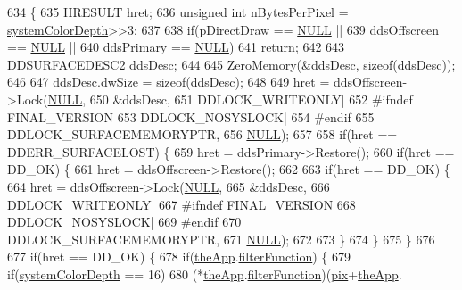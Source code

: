 \begin{DoxyCode}
634 \{
635   HRESULT hret;
636   \textcolor{keywordtype}{unsigned} \textcolor{keywordtype}{int} nBytesPerPixel = \mbox{\hyperlink{system_8cpp_adaf454a4617a00b5cfed14c203ab6efa}{systemColorDepth}}>>3;
637 
638   \textcolor{keywordflow}{if}(pDirectDraw == \mbox{\hyperlink{getopt1_8c_a070d2ce7b6bb7e5c05602aa8c308d0c4}{NULL}} ||
639      ddsOffscreen == \mbox{\hyperlink{getopt1_8c_a070d2ce7b6bb7e5c05602aa8c308d0c4}{NULL}} ||
640      ddsPrimary == \mbox{\hyperlink{getopt1_8c_a070d2ce7b6bb7e5c05602aa8c308d0c4}{NULL}})
641     \textcolor{keywordflow}{return};
642 
643   DDSURFACEDESC2 ddsDesc;
644   
645   ZeroMemory(&ddsDesc, \textcolor{keyword}{sizeof}(ddsDesc));
646 
647   ddsDesc.dwSize = \textcolor{keyword}{sizeof}(ddsDesc);
648 
649   hret = ddsOffscreen->Lock(\mbox{\hyperlink{getopt1_8c_a070d2ce7b6bb7e5c05602aa8c308d0c4}{NULL}},
650                             &ddsDesc,
651                             DDLOCK\_WRITEONLY|
652 #ifndef FINAL\_VERSION
653                             DDLOCK\_NOSYSLOCK|
654 #endif
655                             DDLOCK\_SURFACEMEMORYPTR,
656                             \mbox{\hyperlink{getopt1_8c_a070d2ce7b6bb7e5c05602aa8c308d0c4}{NULL}});
657 
658   \textcolor{keywordflow}{if}(hret == DDERR\_SURFACELOST) \{
659     hret = ddsPrimary->Restore();
660     \textcolor{keywordflow}{if}(hret == DD\_OK) \{
661       hret = ddsOffscreen->Restore();
662       
663       \textcolor{keywordflow}{if}(hret == DD\_OK) \{
664         hret = ddsOffscreen->Lock(\mbox{\hyperlink{getopt1_8c_a070d2ce7b6bb7e5c05602aa8c308d0c4}{NULL}},
665                                   &ddsDesc,
666                                   DDLOCK\_WRITEONLY|
667 #ifndef FINAL\_VERSION
668                                   DDLOCK\_NOSYSLOCK|
669 #endif
670                                   DDLOCK\_SURFACEMEMORYPTR,
671                                   \mbox{\hyperlink{getopt1_8c_a070d2ce7b6bb7e5c05602aa8c308d0c4}{NULL}});
672         
673       \}
674     \}
675   \}
676     
677   \textcolor{keywordflow}{if}(hret == DD\_OK) \{
678     \textcolor{keywordflow}{if}(\mbox{\hyperlink{_v_b_a_8cpp_a8095a9d06b37a7efe3723f3218ad8fb3}{theApp}}.\mbox{\hyperlink{class_v_b_a_a8267ca41247e8d752776b57a3f8af011}{filterFunction}}) \{
679       \textcolor{keywordflow}{if}(\mbox{\hyperlink{system_8cpp_adaf454a4617a00b5cfed14c203ab6efa}{systemColorDepth}} == 16)
680         (*\mbox{\hyperlink{_v_b_a_8cpp_a8095a9d06b37a7efe3723f3218ad8fb3}{theApp}}.\mbox{\hyperlink{class_v_b_a_a8267ca41247e8d752776b57a3f8af011}{filterFunction}})(\mbox{\hyperlink{_g_b_8cpp_a5ee6554b606dcde59ac92578b33776d0}{pix}}+\mbox{\hyperlink{_v_b_a_8cpp_a8095a9d06b37a7efe3723f3218ad8fb3}{theApp}}.

\end{DoxyCode}
